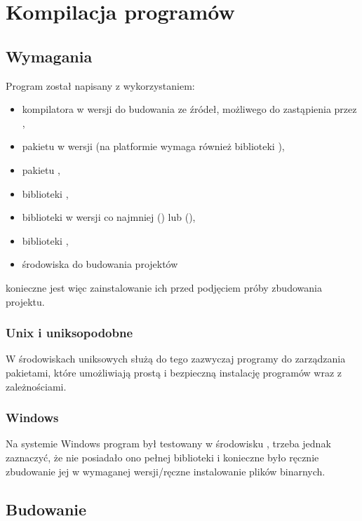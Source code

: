 \documentclass[polish]{standalone}
\begin{document}
\appendix

\chapter{Kompilacja programów}

\section{Wymagania}

Program został napisany z wykorzystaniem:
\begin{itemize}
\item kompilatora  w wersji  do budowania ze źródeł, możliwego do zastąpienia przez  
,
\item pakietu  w wersji  (na platformie  wymaga również biblioteki ),
\item pakietu ,
\item biblioteki ,
\item biblioteki  w wersji co najmniej  () lub  (),
\item biblioteki ,
\item środowiska do budowania projektów 
\end{itemize}
konieczne jest więc zainstalowanie ich przed podjęciem próby zbudowania projektu.

\subsection{Unix i uniksopodobne}

W środowiskach uniksowych służą do tego zazwyczaj programy do zarządzania pakietami, które umożliwiają prostą
i bezpieczną instalację programów wraz z zależnościami.

\subsection{Windows}

Na systemie Windows program był testowany w środowisku , trzeba jednak zaznaczyć, że nie posiadało ono
pełnej biblioteki  i konieczne było ręcznie zbudowanie jej w wymaganej wersji/ręczne instalowanie plików
binarnych.

\section{Budowanie}
\end{document}
